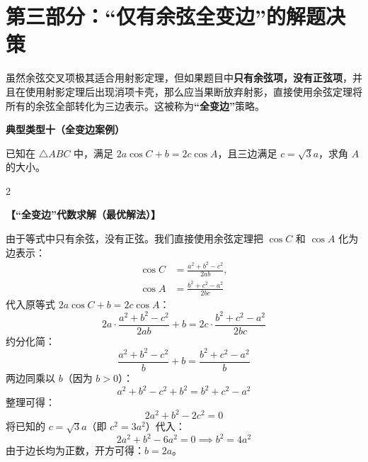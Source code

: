 \documentclass[11pt, a4paper]{ctexart}
\newenvironment{exbox}[1]{%
  \par\addvspace{0.8em}%
  \noindent\textbf{#1}\par\nobreak\begingroup
}{%
  \endgroup\par\addvspace{0.8em}%
}
\newcommand{\teachblock}[2]{%
  \par\addvspace{0.45em}%
  \noindent\textbf{【#1】}\par
  \begingroup
    \setlength{\parskip}{0.35em}%
    #2\par
  \endgroup
}
\begin{document}
\newpage

\section{第三部分：“仅有余弦全变边”的解题决策}

虽然余弦交叉项极其适合用射影定理，但如果题目中\textbf{只有余弦项，没有正弦项}，并且在使用射影定理后出现消项卡壳，那么应当果断放弃射影，直接使用余弦定理将所有的余弦全部转化为三边表示。这被称为\textbf{“全变边”}策略。

\begin{exbox}{典型类型十（全变边案例）}
已知在 $\triangle ABC$ 中，满足 $2a\cos C + b = 2c\cos A$，且三边满足 $c = \sqrt{3}a$，求角 $A$ 的大小。
\end{exbox}

\begin{paracol}{2}
\teachblock{“全变边”代数求解（最优解法）}{
  由于等式中只有余弦，没有正弦。我们直接使用余弦定理把 $\cos C$ 和 $\cos A$ 化为边表示：
  \[
  \begin{aligned}
  \cos C &= \frac{a^2+b^2-c^2}{2ab}, \\
  \cos A &= \frac{b^2+c^2-a^2}{2bc}
  \end{aligned}
  \]
  代入原等式 $2a\cos C + b = 2c\cos A$：
  \[
  2a \cdot \frac{a^2+b^2-c^2}{2ab} + b = 2c \cdot \frac{b^2+c^2-a^2}{2bc}
  \]
  约分化简：
  \[
  \frac{a^2+b^2-c^2}{b} + b = \frac{b^2+c^2-a^2}{b}
  \]
  两边同乘以 $b$（因为 $b > 0$）：
  \[
  a^2 + b^2 - c^2 + b^2 = b^2 + c^2 - a^2
  \]
  整理可得：
  \[
  2a^2 + b^2 - 2c^2 = 0
  \]
  将已知的 $c = \sqrt{3}a$（即 $c^2 = 3a^2$）代入：
  \[
  2a^2 + b^2 - 6a^2 = 0 \implies b^2 = 4a^2
  \]
  由于边长均为正数，开方可得：$b = 2a$。
  
}
\end{paracol}
\end{document}
